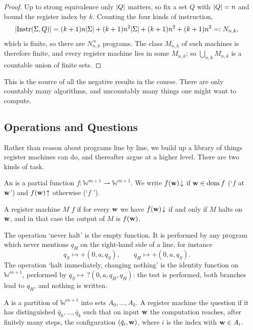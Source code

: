 \documentclass[a4paper]{scrartcl}
\newcommand{\WW}{\mathbb{W}}
\newcommand{\dom}{\operatorname{dom}}
\newcommand{\Instr}{\operatorname{Instr}}
\begin{document}
\begin{proof}
	Up to strong equivalence only $\lvert Q\rvert$ matters, so fix a set $Q$ with $\lvert Q\rvert = n$ and bound the register index by $k$. Counting the four kinds of instruction,
	$$\abs{\Instr(\Sigma,Q)} = (k+1)n\abs{\Sigma} + (k+1)n^2\abs{\Sigma} + (k+1)n^2 + (k+1)n^2 =: N_{n,k},$$
	which is finite, so there are $N_{n,k}^{\,n}$ programs. The class $M_{n,k}$ of such machines is therefore finite, and every register machine lies in some $M_{n,k}$; so $\bigcup_{n,k}M_{n,k}$ is a countable union of finite sets.
\end{proof}

This is the source of all the negative results in the course. There are only countably many algorithms, and uncountably many things one might want to compute.

\subsection{Operations and Questions}

Rather than reason about programs line by line, we build up a library of things register machines can do, and thereafter argue at a higher level. There are two kinds of task.

\begin{definition}[Operation]
	An  is a partial function $f \colon \WW^{m+1} \rightharpoonup \WW^{m+1}$. We write $f(\mathbf{w})\!\downarrow$ if $\vv w \in \dom f$ (`$f$  at $\mathbf{w}$') and $f(\mathbf{w})\!\uparrow$ otherwise (`$f$ ').

	A register machine $M$  $f$ if for every $\mathbf{w}$ we have $f(\mathbf{w})\!\downarrow$ if and only if $M$ halts on $\mathbf{w}$, and in that case the output of $M$ is $f(\mathbf{w})$.
\end{definition}

\begin{example}
	The operation `never halt' is the empty function. It is performed by any program which never mentions $q_H$ on the right-hand side of a line, for instance
	$$q_S \mapsto +(0,a,q_S), \qquad q_H \mapsto +(0,a,q_S).$$
	The operation `halt immediately, changing nothing' is the identity function on $\WW^{m+1}$, performed by $q_S \mapsto\, ?(0,a,q_H,q_H)$: the test is performed, both branches lead to $q_H$, and nothing is written.
\end{example}

\begin{definition}[Question]
	A  is a partition of $\WW^{m+1}$ into sets $A_0, \dots, A_k$. A register machine  the question if it has distinguished  $\bar q_0, \dots, \bar q_k$ such that on input $\mathbf{w}$ the computation reaches, after finitely many steps, the configuration $(\bar q_i, \mathbf{w})$, where $i$ is the index with $\mathbf{w} \in A_i$.
\end{definition}
\end{document}
